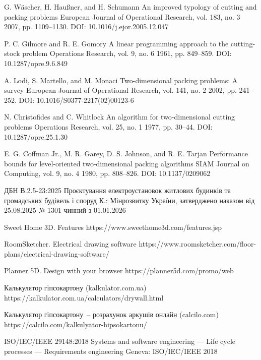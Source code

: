 

\bibitemieee
{G. Wäscher, H. Haußner, and H. Schumann}
{An improved typology of cutting and packing problems}
{European Journal of Operational Research, vol. 183, no. 3}
{2007, pp. 1109--1130. DOI: 10.1016/j.ejor.2005.12.047}

\bibitemieee
{P. C. Gilmore and R. E. Gomory}
{A linear programming approach to the cutting-stock problem}
{Operations Research, vol. 9, no. 6}
{1961, pp. 849--859. DOI: 10.1287/opre.9.6.849}

\bibitemieee
{A. Lodi, S. Martello, and M. Monaci}
{Two-dimensional packing problems: A survey}
{European Journal of Operational Research, vol. 141, no. 2}
{2002, pp. 241--252. DOI: 10.1016/S0377-2217(02)00123-6}

\bibitemieee
{N. Christofides and C. Whitlock}
{An algorithm for two-dimensional cutting problems}
{Operations Research, vol. 25, no. 1}
{1977, pp. 30--44. DOI: 10.1287/opre.25.1.30}

\bibitemieee
{E. G. Coffman Jr., M. R. Garey, D. S. Johnson, and R. E. Tarjan}
{Performance bounds for level-oriented two-dimensional packing algorithms}
{SIAM Journal on Computing, vol. 9, no. 4}
{1980, pp. 808--826. DOI: 10.1137/0209062}

\bibitemieee
{ДБН В.2.5-23:2025}
{Проєктування електроустановок житлових будинків та громадських будівель і споруд}
{К.: Мінрозвитку України, затверджено наказом від 25.08.2025 № 1301}
{чинний з 01.01.2026}

\bibitemweb
{Sweet Home 3D. Features}
{https://www.sweethome3d.com/features.jsp}
{}

\bibitemweb
{RoomSketcher. Electrical drawing software}
{https://www.roomsketcher.com/floor-plans/electrical-drawing-software/}
{}

\bibitemweb
{Planner 5D. Design with your browser}
{https://planner5d.com/promo/web}
{}

\bibitemweb
{Калькулятор гіпсокартону (kalkulator.com.ua)}
{https://kalkulator.com.ua/calculators/drywall.html}
{}

\bibitemweb
{Калькулятор гіпсокартону~-- розрахунок аркушів онлайн (calcilo.com)}
{https://calcilo.com/kalkulyator-hipsokartonu/}
{}

\bibitemieee
{ISO/IEC/IEEE 29148:2018}
{Systems and software engineering --- Life cycle processes --- Requirements engineering}
{Geneva: ISO/IEC/IEEE}
{2018}


